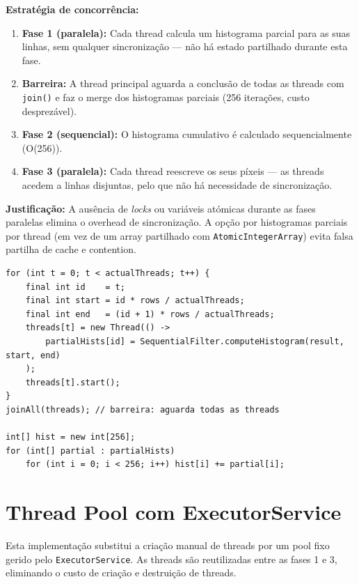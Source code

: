 \documentclass[a4paper,11pt,openright,BCOR=15mm]{scrbook}
\begin{document}
\textbf{Estratégia de concorrência:}
\begin{enumerate}
    \item \textbf{Fase 1 (paralela):} Cada thread calcula um histograma parcial para as suas linhas, sem qualquer sincronização --- não há estado partilhado durante esta fase.
    \item \textbf{Barreira:} A thread principal aguarda a conclusão de todas as threads com \texttt{join()} e faz o merge dos histogramas parciais (256 iterações, custo desprezável).
    \item \textbf{Fase 2 (sequencial):} O histograma cumulativo é calculado sequencialmente (O(256)).
    \item \textbf{Fase 3 (paralela):} Cada thread reescreve os seus píxeis --- as threads acedem a linhas disjuntas, pelo que não há necessidade de sincronização.
\end{enumerate}

\textbf{Justificação:} A ausência de \textit{locks} ou variáveis atómicas durante as fases paralelas elimina o overhead de sincronização. A opção por histogramas parciais por thread (em vez de um array partilhado com \texttt{AtomicIntegerArray}) evita falsa partilha de cache e contention.

\begin{lstlisting}[caption={Fase paralela de histograma com threads manuais}]
for (int t = 0; t < actualThreads; t++) {
    final int id    = t;
    final int start = id * rows / actualThreads;
    final int end   = (id + 1) * rows / actualThreads;
    threads[t] = new Thread(() ->
        partialHists[id] = SequentialFilter.computeHistogram(result, start, end)
    );
    threads[t].start();
}
joinAll(threads); // barreira: aguarda todas as threads

int[] hist = new int[256];
for (int[] partial : partialHists)
    for (int i = 0; i < 256; i++) hist[i] += partial[i];
\end{lstlisting}

\section{Thread Pool com ExecutorService}

Esta implementação substitui a criação manual de threads por um pool fixo gerido pelo \texttt{ExecutorService}. As threads são reutilizadas entre as fases 1 e 3, eliminando o custo de criação e destruição de threads.
\end{document}

